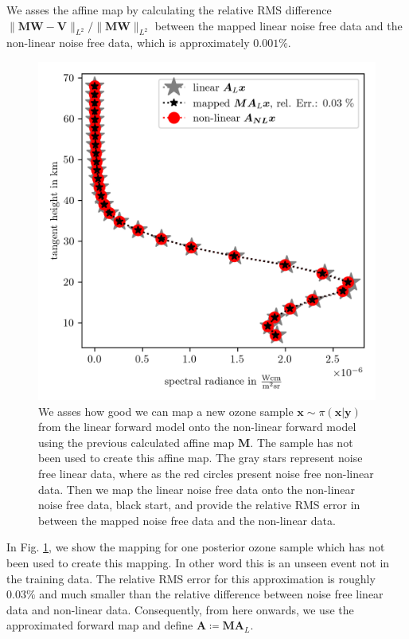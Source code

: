 We asses the affine map by calculating the relative RMS difference $\lVert \bm{M}\bm{W} - \bm{V}  \rVert_{L^2} / \lVert \bm{M}\bm{W} \rVert_{L^2} $ between the mapped linear noise free data and the non-linear noise free data, which is approximately $0.001\%$.
\begin{figure}[ht!]
	\centering
	\includegraphics{SampMapAssesmentTT.png}
	\caption[Assessment of affine map.]{We asses how good we can map a new ozone sample $\bm{x} \sim \pi(\bm{x}|\bm{y})$ from the linear forward model onto the non-linear forward model using the previous calculated affine map $\bm{M}$. The sample has not been used to create this affine map. The gray stars represent noise free linear data, where as the red circles present noise free non-linear data. Then we map the linear noise free data onto the non-linear noise free data, black start, and provide the relative RMS error in between the mapped noise free data and the non-linear data.}
	\label{fig:MapAsses}
\end{figure}
In Fig. \ref{fig:MapAsses}, we show the mapping for one posterior ozone sample which has not been used to create this mapping.
In other word this is an unseen event not in the training data.
The relative RMS error for this approximation is roughly $0.03\%$ and much smaller than the relative difference between noise free linear data and non-linear data.
Consequently, from here onwards, we use the approximated forward map and define $\bm{A} \coloneqq \bm{M A}_L $.
\clearpage



